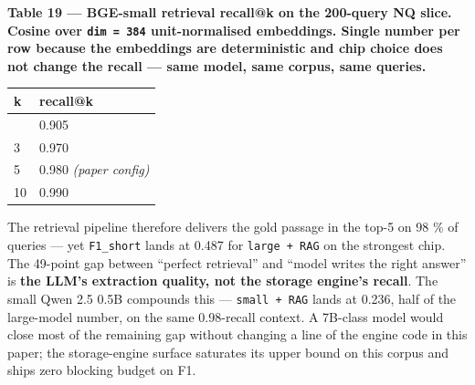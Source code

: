 \textbf{Table 19 --- BGE-small retrieval recall@k on the 200-query NQ slice.
Cosine over \texttt{dim\ =\ 384} unit-normalised embeddings. Single number per
row because the embeddings are deterministic and chip choice does not change the
recall --- same model, same corpus, same queries.}

{\def\LTcaptype{none} %
\begin{longtable}[]{@{}ll@{}}
\toprule\noalign{}
k & recall@k \\
\midrule\noalign{}
\endhead
\bottomrule\noalign{}
\endlastfoot
1 & 0.905 \\
3 & 0.970 \\
5 & 0.980 \emph{(paper config)} \\
10 & 0.990 \\
\end{longtable}
}

The retrieval pipeline therefore delivers the gold passage in the top-5 on 98 \%
of queries --- yet \texttt{F1\_short} lands at 0.487 for \texttt{large\ +\ RAG}
on the strongest chip. The 49-point gap between ``perfect retrieval'' and
``model writes the right answer'' is \textbf{the LLM's extraction quality, not
the storage engine's recall}. The small Qwen 2.5 0.5B compounds this ---
\texttt{small\ +\ RAG} lands at 0.236, half of the large-model number, on the
same 0.98-recall context. A 7B-class model would close most of the remaining gap
without changing a line of the engine code in this paper; the storage-engine
surface saturates its upper bound on this corpus and ships zero blocking budget
on F1.

